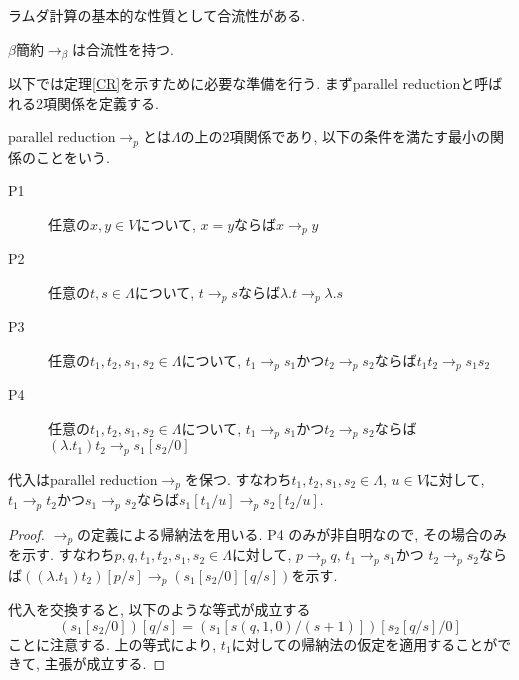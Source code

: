 \documentclass{ltjsarticle}
\begin{document}
ラムダ計算の基本的な性質として合流性がある.

\begin{thm}\label{CR}
 $\beta$簡約$\rightarrow_{\beta}$は合流性を持つ.
\end{thm}

以下では定理\ref{CR}を示すために必要な準備を行う. まずparallel reductionと呼ばれる2項関係を定義する.

\begin{defn}
 parallel reduction$\rightarrow_{p}$とは$\Lambda$の上の$2$項関係であり, 以下の条件を満たす最小の関係のことをいう.
 \begin{description}
  \item[P1] 任意の$x, y \in V$について, $x = y$ならば$x \rightarrow_{p} y$
  \item[P2] 任意の$t, s \in \Lambda$について, $t \rightarrow_{p} s$ならば$\lambda. t \rightarrow_{p} \lambda. s$
  \item[P3] 任意の$t_1, t_2, s_1, s_2 \in \Lambda$について,
        $t_1 \rightarrow_{p} s_1$かつ$t_2 \rightarrow_{p} s_2$ならば$t_1 t_2 \rightarrow_{p} s_1 s_2$
  \item[P4] 任意の$t_1, t_2, s_1, s_2 \in \Lambda$について,
        $t_1 \rightarrow_{p} s_1$かつ$t_2 \rightarrow_{p} s_2$ならば$(\lambda. t_1) t_2 \rightarrow_{p} s_1[s_2/0]$
 \end{description}
\end{defn}

\begin{lem}\label{spp}
 代入はparallel reduction$\rightarrow_{p}$を保つ. すなわち$t_1, t_2, s_1, s_2 \in \Lambda$, $u \in V$に対して, $t_1 \rightarrow_{p} t_2$かつ$s_1 \rightarrow_{p} s_2$ならば$s_1[t_1/u] \rightarrow_{p} s_2[t_2/u]$.
\end{lem}

\begin{proof}
 $\rightarrow_{p}$の定義による帰納法を用いる. P4%
のみが非自明なので, その場合のみを示す.
 すなわち$p, q, t_1, t_2, s_1, s_2 \in \Lambda$に対して,
$p \rightarrow_{p} q$, $t_1 \rightarrow_{p} s_1$かつ $t_2 \rightarrow_{p} s_2$ならば$((\lambda. t_1) t_2) [p / s] \rightarrow_{p} (s_1 [s_2 / 0] [q / s])$を示す.
 
 代入を交換すると, 以下のような等式が成立する
 \[
 (s_1 [s_2 / 0]) [q / s] = (s_1 [s(q, 1, 0) / (s + 1)]) [s_2 [q / s] / 0]
 \]
 ことに注意する. 上の等式により, $t_1$に対しての帰納法の仮定を適用することができて, 主張が成立する.
\end{proof}
\end{document}

